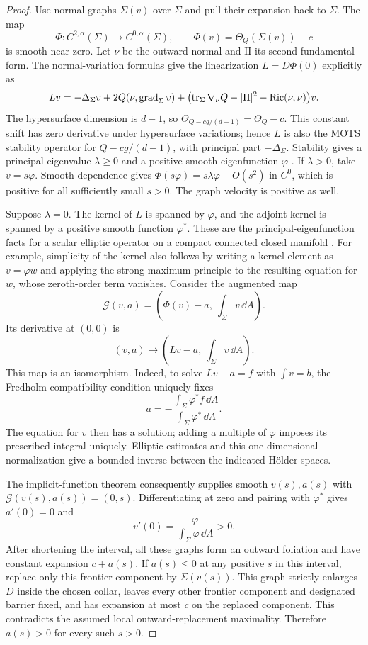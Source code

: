 \begin{proof}
Use normal graphs $\Sigma(v)$ over $\Sigma$ and pull their expansion
back to $\Sigma$.  The map
\[
 \Phi:C^{2,\alpha}(\Sigma)\longrightarrow C^{0,\alpha}(\Sigma),
 \qquad
 \Phi(v)=\Theta_Q(\Sigma(v))-c
\]
is smooth near zero.  Let $\nu$ be the outward normal and
$\mathrm{II}$ its second fundamental form.  The normal-variation
formulas give the linearization $L=D\Phi(0)$ explicitly as
\[
 Lv=-\Delta_\Sigma v+2Q(\nu,\operatorname{grad}_\Sigma v)
   +\bigl(\operatorname{tr}_\Sigma\nabla_\nu Q-|\mathrm{II}|^2
                          -\operatorname{Ric}(\nu,\nu)\bigr)v.
\]
The hypersurface dimension is $d-1$, so
$\Theta_{Q-cg/(d-1)}=\Theta_Q-c$.  This constant shift has zero
derivative under hypersurface variations; hence $L$ is also the
MOTS stability operator for $Q-cg/(d-1)$, with principal part
$-\Delta_\Sigma$.  Stability gives a principal eigenvalue
$\lambda\geq0$ and a positive smooth eigenfunction $\varphi$
\cite[Proposition~5.1]{AnderssonMarsSimon2008}.
If $\lambda>0$, take $v=s\varphi$.  Smooth dependence gives
$\Phi(s\varphi)=s\lambda\varphi+O(s^2)$ in $C^0$, which is
positive for all sufficiently small $s>0$.  The graph velocity is
positive as well.

Suppose $\lambda=0$.  The kernel of $L$ is spanned by $\varphi$,
and the adjoint kernel is spanned by a positive smooth function
$\varphi^*$.  These are the principal-eigenfunction facts for a
scalar elliptic operator on a compact connected closed manifold
\cite[Section~4, Lemma~4.1]{AnderssonMarsSimon2008}.  For
example, simplicity of the kernel also follows by writing a kernel
element as $v=\varphi w$ and applying the strong maximum principle
to the resulting equation for $w$, whose zeroth-order term vanishes.
Consider the augmented map
\[
 \mathcal G(v,a)
   =\left(\Phi(v)-a,\ \int_\Sigma v\,\dd A\right).
\]
Its derivative at $(0,0)$ is
\begin{equation}\label{n3:domains:augmented-linearization}
 (v,a)\longmapsto
 \left(Lv-a,\ \int_\Sigma v\,\dd A\right).
\end{equation}
This map is an isomorphism.  Indeed, to solve $Lv-a=f$ with
$\int v=b$, the Fredholm compatibility condition uniquely fixes
\[
 a=-\frac{\int_\Sigma\varphi^*f\,\dd A}
          {\int_\Sigma\varphi^*\,\dd A}.
\]
The equation for $v$ then has a solution; adding a multiple of
$\varphi$ imposes its prescribed integral uniquely.  Elliptic
estimates and this one-dimensional normalization give a bounded
inverse between the indicated H\"older spaces.

The implicit-function theorem consequently supplies smooth
$v(s),a(s)$ with $\mathcal G(v(s),a(s))=(0,s)$.  Differentiating at
zero and pairing with $\varphi^*$ gives $a'(0)=0$ and
\[
 v'(0)=\frac{\varphi}{\int_\Sigma\varphi\,\dd A}>0.
\]
After shortening the interval, all these graphs form an outward
foliation and have constant expansion $c+a(s)$.  If $a(s)\leq0$
at any positive $s$ in this interval, replace only this frontier
component by $\Sigma(v(s))$.  This graph strictly enlarges $D$
inside the chosen collar, leaves every other frontier component
and designated barrier fixed, and has expansion at most $c$ on
the replaced component.  This contradicts the assumed local
outward-replacement maximality.  Therefore $a(s)>0$ for every such
$s>0$.


\end{proof}
